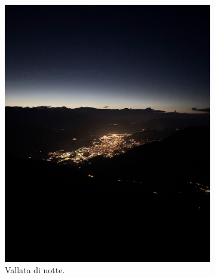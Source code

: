 \documentclass{article}
\begin{document}

\begin{figure}[htbp!]
    \centering
    \begin{subfigure}[b]{0.45\textwidth}
        \includegraphics[width=\textwidth]{images/foto_bivaccoNotturna.jpg}
        \caption{Vallata di notte.}
    \end{subfigure}
    \hfill
    \begin{subfigure}[b]{0.45\textwidth}

\end{subfigure}
\end{figure}
\end{document}
